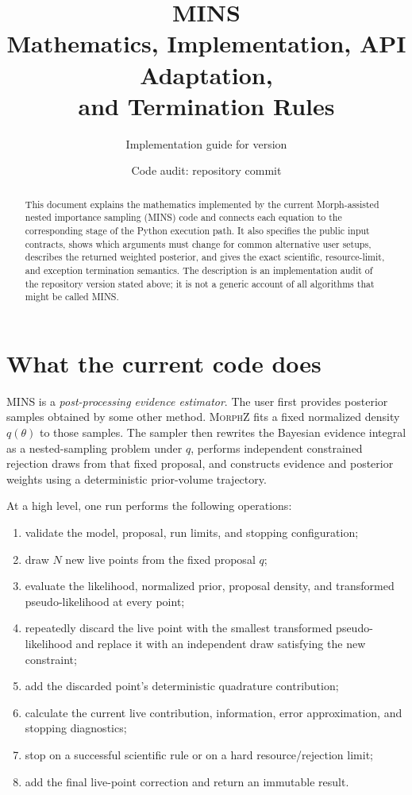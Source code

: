 \documentclass[11pt,a4paper]{article}
\title{\textbf{MINS}\\
Mathematics, Implementation, API Adaptation,\\
and Termination Rules}
\author{Implementation guide for \code{mins} version \code{0.1.0.dev3}}
\date{Code audit: repository commit \code{934195f}}
\newcommand{\MINS}{\textsc{MINS}}
\newcommand{\MorphZ}{\textsc{MorphZ}}
\begin{document}
\maketitle

\begin{abstract}
This document explains the mathematics implemented by the current
Morph-assisted nested importance sampling (\MINS) code and connects each
equation to the corresponding stage of the Python execution path.  It also
specifies the public input contracts, shows which arguments must change for
common alternative user setups, describes the returned weighted posterior,
and gives the exact scientific, resource-limit, and exception termination
semantics.  The description is an implementation audit of the repository
version stated above; it is not a generic account of all algorithms that might
be called MINS.
\end{abstract}

\tableofcontents
\newpage

\section{What the current code does}

\MINS{} is a \emph{post-processing evidence estimator}.  The user first
provides posterior samples obtained by some other method.  \MorphZ{} fits a
fixed normalized density \(q(\theta)\) to those samples.  The sampler then
rewrites the Bayesian evidence integral as a nested-sampling problem under
\(q\), performs independent constrained rejection draws from that fixed
proposal, and constructs evidence and posterior weights using a deterministic
prior-volume trajectory.

At a high level, one run performs the following operations:

\begin{enumerate}
  \item validate the model, proposal, run limits, and stopping configuration;
  \item draw \(N\) new live points from the fixed proposal \(q\);
  \item evaluate the likelihood, normalized prior, proposal density, and
        transformed pseudo-likelihood at every point;
  \item repeatedly discard the live point with the smallest transformed
        pseudo-likelihood and replace it with an independent draw satisfying
        the new constraint;
  \item add the discarded point's deterministic quadrature contribution;
  \item calculate the current live contribution, information, error
        approximation, and stopping diagnostics;
  \item stop on a successful scientific rule or on a hard resource/rejection
        limit;
  \item add the final live-point correction and return an immutable result.
\end{enumerate}
\end{document}
